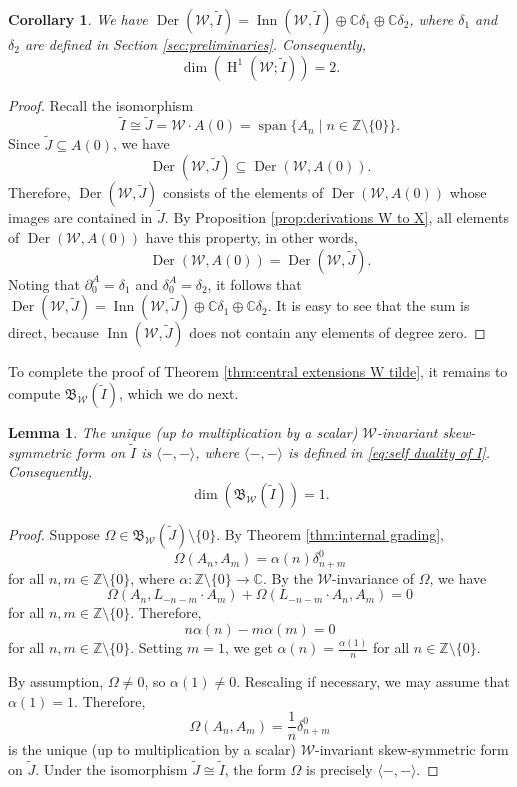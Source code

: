 \documentclass[11pt, svgnames]{amsart}
\DeclareMathOperator{\spn}{span}
\newcommand{\B}{\mathfrak{B}}
\newcommand{\ZZ}{\mathbb{Z}}
\newcommand{\CC}{\mathbb{C}}
\newcommand{\W}{\mathcal{W}}
\DeclareMathOperator{\Der}{Der}
\DeclareMathOperator{\Inn}{Inn}
\newcommand{\del}{\partial}
\DeclareMathOperator{\HH}{H}
\newcommand{\nonzero}{\setminus \{0\}}
\newcommand{\ang}[1]{\langle #1 \rangle}
\newtheorem{lemma}[proposition]{Lemma}
\newtheorem{corollary}[proposition]{Corollary}
\theoremstyle{definition}
\begin{document}
\begin{corollary}\label{cor:derivations W to I tilde}
    We have $\Der(\W,\widetilde{I}) = \Inn(\W,\widetilde{I}) \oplus \CC \delta_1 \oplus \CC \delta_2$, where $\delta_1$ and $\delta_2$ are defined in Section \ref{sec:preliminaries}. Consequently,
    $$\dim(\HH^1(\W;\widetilde{I})) = 2.$$
\end{corollary}
\begin{proof}
    Recall the isomorphism
    $$\widetilde{I} \cong \widetilde{J} = \W \cdot A(0) = \spn\{A_n \mid n \in \ZZ \nonzero\}.$$
    Since $\widetilde{J} \subseteq A(0)$, we have
    $$\Der(\W,\widetilde{J}) \subseteq \Der(\W,A(0)).$$
    Therefore, $\Der(\W,\widetilde{J})$ consists of the elements of $\Der(\W,A(0))$ whose images are contained in $\widetilde{J}$. By Proposition \ref{prop:derivations W to X}, all elements of $\Der(\W,A(0))$ have this property, in other words,
    $$\Der(\W,A(0)) = \Der(\W,\widetilde{J}).$$
    Noting that $\del_0^A = \delta_1$ and $\delta_0^A = \delta_2$, it follows that $\Der(\W,\widetilde{J}) = \Inn(\W,\widetilde{J}) \oplus \CC \delta_1 \oplus \CC \delta_2$. It is easy to see that the sum is direct, because $\Inn(\W,\widetilde{J})$ does not contain any elements of degree zero.
\end{proof}

To complete the proof of Theorem \ref{thm:central extensions W tilde}, it remains to compute $\B_\W(\widetilde{I})$, which we do next.

\begin{lemma}\label{lem:invariant forms on I tilde}
    The unique (up to multiplication by a scalar) $\W$-invariant skew-symmetric form on $\widetilde{I}$ is $\ang{-,-}$, where $\ang{-,-}$ is defined in \eqref{eq:self duality of I}. Consequently,
    $$\dim(\B_\W(\widetilde{I})) = 1.$$
\end{lemma}
\begin{proof}
    Suppose $\Omega \in \B_\W(\widetilde{J}) \nonzero$. By Theorem \ref{thm:internal grading},
    $$\Omega(A_n,A_m) = \alpha(n)\delta_{n+m}^0$$
    for all $n,m \in \ZZ \nonzero$, where $\alpha \colon \ZZ \nonzero \to \CC$. By the $\W$-invariance of $\Omega$, we have
    $$\Omega(A_n, L_{-n - m} \cdot A_m) + \Omega(L_{-n - m} \cdot A_n,A_m) = 0$$
    for all $n,m \in \ZZ \nonzero$. Therefore,
    $$n \alpha(n) - m \alpha(m) = 0$$
    for all $n,m \in \ZZ \nonzero$. Setting $m = 1$, we get $\alpha(n) = \frac{\alpha(1)}{n}$ for all $n \in \ZZ \nonzero$.

    By assumption, $\Omega \neq 0$, so $\alpha(1) \neq 0$. Rescaling if necessary, we may assume that $\alpha(1) = 1$. Therefore,
    $$\Omega(A_n,A_m) = \frac{1}{n}\delta_{n + m}^0$$
    is the unique (up to multiplication by a scalar) $\W$-invariant skew-symmetric form on $\widetilde{J}$. Under the isomorphism $\widetilde{J} \cong \widetilde{I}$, the form $\Omega$ is precisely $\ang{-,-}$.
\end{proof}
\end{document}
